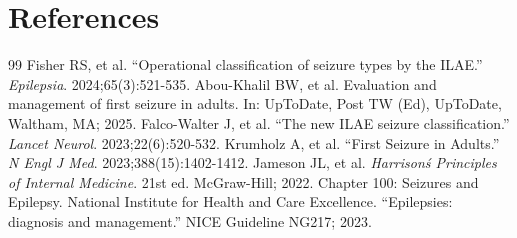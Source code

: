 \section*{References}
\begin{thebibliography}{99}
 Fisher RS, et al. ``Operational classification of seizure types by the ILAE.'' \emph{Epilepsia}. 2024;65(3):521-535.
 Abou-Khalil BW, et al. Evaluation and management of first seizure in adults. In: UpToDate, Post TW (Ed), UpToDate, Waltham, MA; 2025.
 Falco-Walter J, et al. ``The new ILAE seizure classification.'' \emph{Lancet Neurol}. 2023;22(6):520-532.
 Krumholz A, et al. ``First Seizure in Adults.'' \emph{N Engl J Med}. 2023;388(15):1402-1412.
 Jameson JL, et al. \emph{Harrison\'s Principles of Internal Medicine}. 21st ed. McGraw-Hill; 2022. Chapter 100: Seizures and Epilepsy.
 National Institute for Health and Care Excellence. ``Epilepsies: diagnosis and management.'' NICE Guideline NG217; 2023.
\end{thebibliography}
